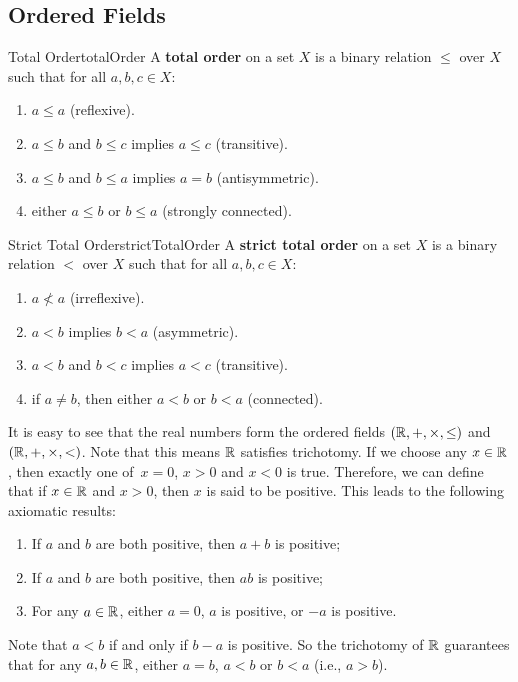 \documentclass[math]{amznotes}
\theoremstyle{remark}
\begin{document}
\subsection{Ordered Fields}
\begin{dfnbox}{Total Order}{totalOrder}
    A {\color{red} \textbf{total order}} on a set $X$ is a binary relation $\leq$ over $X$ such that for all $a, b, c \in X$:
    \begin{enumerate}
        \item $a \leq a$ (reflexive).
        \item $a \leq b$ and $b \leq c$ implies $a \leq c$ (transitive).
        \item $a \leq b$ and $b \leq a$ implies $a = b$ (antisymmetric).
        \item either $a \leq b$ or $b \leq a$ (strongly connected).
    \end{enumerate}
\end{dfnbox}
\begin{dfnbox}{Strict Total Order}{strictTotalOrder}
    A {\color{red} \textbf{strict total order}} on a set $X$ is a binary relation $<$ over $X$ such that for all $a, b, c \in X$:
    \begin{enumerate}
        \item $a \not < a$ (irreflexive).
        \item $a < b$ implies $b < a$ (asymmetric).
        \item $a < b$ and $b < c$ implies $a < c$ (transitive).
        \item if $a \neq b$, then either $a < b$ or $b < a$ (connected).
    \end{enumerate}
\end{dfnbox}
It is easy to see that the real numbers form the ordered fields $(\mathbb{R}, +, \times, \leq)$ and $(\mathbb{R}, +, \times, <)$. Note that this means $\mathbb{R}$ satisfies trichotomy. If we choose any $x \in \mathbb{R}$, then exactly one of~$x = 0$, $x > 0$ and $x < 0$ is true. Therefore, we can define that if $x \in \mathbb{R}$ and $x > 0$, then $x$ is said to be positive. This leads to the following axiomatic results:
\begin{enumerate}
    \item If $a$ and $b$ are both positive, then $a + b$ is positive;
    \item If $a$ and $b$ are both positive, then $ab$ is positive;
    \item For any $a \in \mathbb{R}$, either $a = 0$, $a$ is positive, or $-a$ is positive.
\end{enumerate}
Note that $a < b$ if and only if $b - a$ is positive. So the trichotomy of $\mathbb{R}$ guarantees that for any $a, b \in \mathbb{R}$, either $a = b$, $a < b$ or $b < a$ (i.e., $a > b$).
\end{document}
